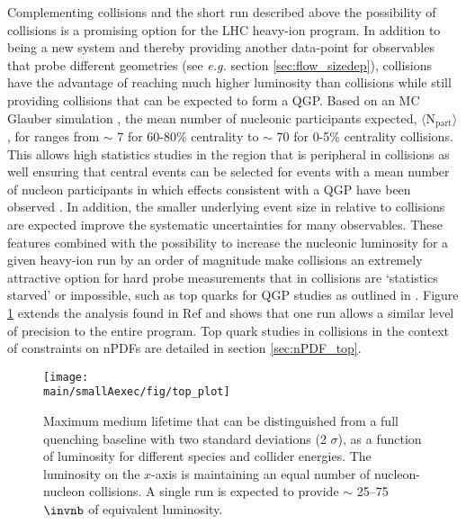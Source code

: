 Complementing \PbPb collisions and the short \OO run described above the possibility of \ArAr collisions is a promising option for the LHC heavy-ion program.  In addition to being a new system and thereby providing another data-point for observables that probe different geometries (see \textit{e.g.} section \ref{sec:flow_sizedep}), \ArAr collisions have the advantage of reaching much higher luminosity than \PbPb collisions while still providing collisions that can be expected to form a QGP.  Based on an MC Glauber simulation \cite{Miller:2007ri}, the mean number of nucleonic participants expected, $\langle \mathrm{N_{part}}\rangle$, for \ArAr ranges from  $\sim$ 7 for 60-80\% centrality to $\sim$ 70 for 0-5\% centrality collisions.  This allows high statistics studies in the region that is peripheral in \PbPb collisions as well ensuring that central events can be selected for events with a mean number of nucleon participants in which effects consistent with a QGP have been observed \cite{Sirunyan:2018eqi, ATLAS-CONF-2018-007}.  In addition, the smaller underlying event size in \ArAr relative to \PbPb collisions are expected improve the systematic uncertainties for many observables.  These features combined with the possibility to increase the nucleonic luminosity for a given heavy-ion run by an order of magnitude make \ArAr collisions an extremely attractive option for hard probe measurements that in \PbPb collisions are `statistics starved' or impossible, such as top quarks for QGP studies as outlined in \cite{Apolinario:2017sob}.  Figure \ref{fig:boosted_tops} extends the analysis found in Ref \cite{Apolinario:2017sob} and shows that one \ArAr run allows a similar level of precision to the entire \PbPb program.  Top quark studies in \ArAr collisions in the context of constraints on nPDFs are detailed in section \ref{sec:nPDF_top}.
\begin{figure}
\centering
\texttt{[image: \\main/smallAexec/fig/top\_plot]}
\caption{Maximum medium lifetime that can be distinguished from a full quenching baseline with two standard deviations (2 $\sigma$), as a function of luminosity for different species and collider energies. The luminosity on the $x$-axis is maintaining an equal number of nucleon-nucleon collisions. A single \ArAr run is expected to provide $\sim$ 25--75 $\invnb$ of \PbPb equivalent luminosity.}
\label{fig:boosted_tops}
\end{figure}

